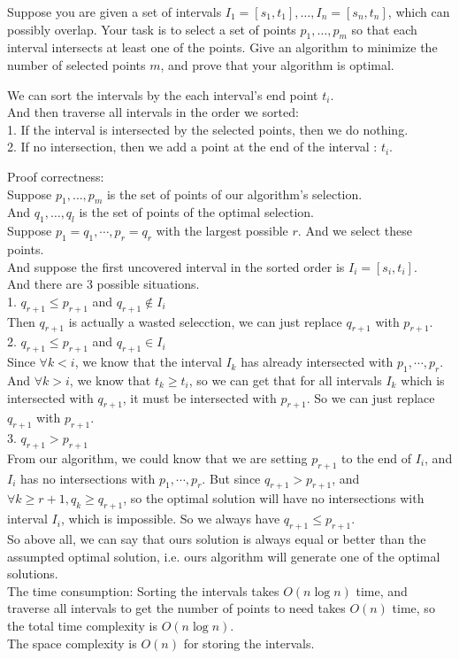\problem{}
Suppose you are given a set of intervals $I_1 = [s_1, t_1], \ldots, I_n = [s_n, t_n]$, which can possibly overlap.  Your task is to select a set of points $p_1, \ldots, p_m$ so that each interval intersects at least one of the points.  Give an algorithm to minimize the number of selected points $m$, and prove that your algorithm is optimal.

\solution{}
We can sort the intervals by the each interval's end point $t_i$.\\
And then traverse all intervals in the order we sorted:\\
1. If the interval is intersected by the selected points, then we do nothing.\\
2. If no intersection, then we add a point at the end of the interval : $t_i$.

Proof correctness:\\
Suppose $p_1, \ldots, p_m$ is the set of points of our algorithm's selection.\\
And $q_1, \ldots, q_l$ is the set of points of the optimal selection.\\
Suppose $p_1=q_1, \cdots, p_r=q_r$ with the largest possible $r$. And we select these points.\\
And suppose the first uncovered interval in the sorted order is $I_i=[s_i, t_i]$.\\
And there are $3$ possible situations.\\
1. $q_{r+1} \leq p_{r+1}$ and $q_{r+1}\not\in I_i$\\
Then $q_{r+1}$ is actually a wasted selecction, we can just replace $q_{r+1}$ with $p_{r+1}$.\\
2. $q_{r+1} \leq p_{r+1}$ and $q_{r+1}\in I_i$\\
Since $\forall k<i$, we know that the interval $I_k$ has already intersected with $p_1,\cdots,p_r$.\\
And $\forall k>i$, we know that $t_k\geq t_i$, so we can get that for all intervals $I_k$ which is intersected with $q_{r+1}$, it must be intersected with $p_{r+1}$.
So we can just replace $q_{r+1}$ with $p_{r+1}$.\\
3. $q_{r+1} > p_{r+1}$\\
From our algorithm, we could know that we are setting $p_{r+1}$ to the end of $I_i$, and $I_i$ has no intersections with $p_{1},\cdots,p_r$.
But since $q_{r+1}>p_{r+1}$, and $\forall k\geq r+1, q_k\geq q_{r+1}$, so the optimal solution will have no intersections with interval $I_i$,
which is impossible. So we always have $q_{r+1}\leq p_{r+1}$.\\
So above all, we can say that ours solution is always equal or better than the assumpted optimal solution, i.e. ours algorithm will generate one of the optimal solutions.\\
The time consumption: Sorting the intervals takes $O(n\log n)$ time, and traverse all intervals to get the number of points to need takes $O(n)$ time,
so the total time complexity is $O(n\log n)$.\\
The space complexity is $O(n)$ for storing the intervals.\\

\newpage